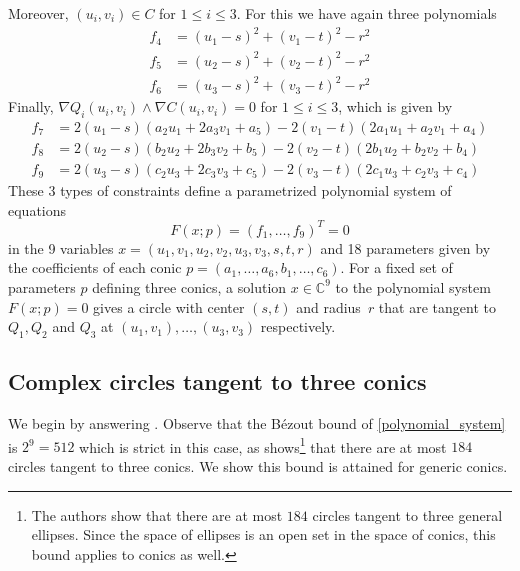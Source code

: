 \documentclass[12pt]{amsart}
\theoremstyle{definition}
\theoremstyle{definition}
\numberwithin{equation}{section}
\newcommand{\CC}{\mathbb{C}}
\begin{document}
Moreover, $(u_{i},v_{i})\in C$ for $1\leq i\leq 3$. For this we have again three polynomials
\begin{align*}
    f_{4} &= (u_{1} - s)^{2} + (v_{1} - t)^{2} - r^{2}\\\nonumber
    f_{5} &= (u_{2} - s)^{2} + (v_{2} - t)^{2} - r^{2}\\\nonumber
    f_{6} &= (u_{3} - s)^{2} + (v_{3} - t)^{2} - r^{2}
\end{align*}
Finally,  $\nabla Q_{i}(u_{i},v_{i}) \wedge \nabla C(u_{i},v_{i})=0$ for $1\leq i\leq 3$, which is given by 
\begin{align*}
    f_{7} &= 2(u_{1}-s)(a_{2}u_{1} + 2a_{3}v_{1} + a_{5}) - 2(v_{1}-t)(2a_{1}u_{1} + a_{2}v_{1} + a_{4})\\\nonumber
    f_{8} &= 2(u_{2}-s)(b_{2}u_{2} + 2b_{3}v_{2} + b_{5}) - 2(v_{2}-t)(2b_{1}u_{2} + b_{2}v_{2} + b_{4}) \\\nonumber
    f_{9} &= 2(u_{3}-s)(c_{2}u_{3} + 2c_{3}v_{3} + c_{5}) - 2(v_{3}-t)(2c_{1}u_{3} + c_{2}v_{3} + c_{4})
\end{align*}
These $3$ types of constraints define a parametrized polynomial system of equations
\begin{equation}\label{polynomial_system}
F(x;p)=(f_{1},\dots,f_{9})^{T} = 0
\end{equation}
in the 9 variables $x=(u_{1}, v_{1}, u_2,v_2, u_{3},v_{3}, s, t, r)$ and  18 parameters given by the coefficients of each conic $p=(a_{1}, \ldots, a_{6}, b_{1}, \ldots, c_{6})$.
For a fixed set of parameters $p$ defining three conics, a solution $x \in \CC^9$ to the polynomial system $F(x;p)=0$ gives a circle with center $(s,t)$ and radius~$r$ that are tangent to $Q_1,Q_2$ and $Q_3$ at $(u_{1},v_{1}), \ldots, (u_{3},v_{3})$ respectively. 

\subsection{Complex circles tangent to three conics}
We begin by answering . Observe that the B\'ezout bound of \eqref{polynomial_system} is $2^9 = 512$ which is strict in this case, as \cite{ApollonianCircles} shows\footnote{The authors show that there are at most $184$ circles tangent to three general ellipses. Since the space of ellipses is an open set in the space of conics, this bound applies to conics as well.} that there are at most $184$ circles tangent to three conics. We show this bound is attained for generic conics.
\end{document}
